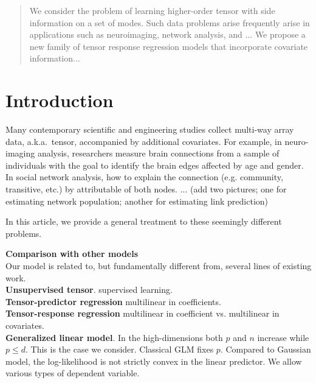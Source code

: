 \documentclass[twoside]{article}
\theoremstyle{plain}
\theoremstyle{definition}
\begin{document}
%

%


\begin{abstract}
We consider the problem of learning higher-order tensor with side information on a set of modes. Such data problems arise frequently arise in applications such as neuroimaging, network analysis, and ... We propose a new family of tensor response regression models that incorporate covariate information...
\end{abstract}

\section{Introduction}

Many contemporary scientific and engineering studies collect multi-way array data, a.k.a.\ tensor, accompanied by additional covariates. For example, in neuro-imaging analysis, researchers measure brain connections from a sample of individuals with the goal to identify the brain edges affected by age and gender. In social network analysis, how to explain the connection (e.g. community, transitive, etc.) by attributable of both nodes. ... 
(add two pictures; one for estimating network population; another for estimating link prediction)

In this article, we provide a general treatment to these seemingly different problems.

{\bf Comparison with other models}\\
Our model is related to, but fundamentally different from, several lines of existing work.\\
{\bf Unsupervised tensor}. supervised learning. \\
{\bf Tensor-predictor regression} multilinear in coefficients. \\
{\bf Tensor-response regression} multilinear in coefficient vs. multilinear in covariates. \\
{\bf Generalized linear model}. In the high-dimensions both $p$ and $n$ increase while $p \leq d$. This is the case we consider. Classical GLM fixes $p$. Compared to Gaussian model, the log-likelihood is not strictly convex in the linear predictor. We allow various types of dependent variable. 
\end{document}
